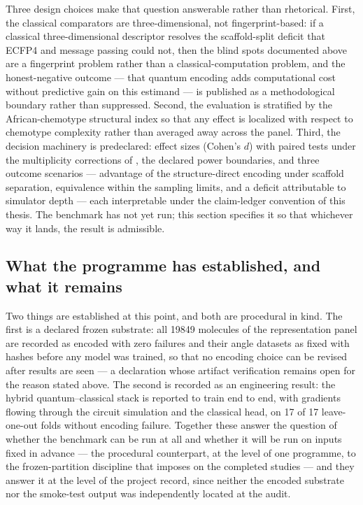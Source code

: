 Three design choices make that question answerable rather than rhetorical. First, the classical comparators are three-dimensional, not fingerprint-based: if a classical three-dimensional descriptor resolves the scaffold-split deficit that ECFP4 and message passing could not, then the blind spots documented above are a fingerprint problem rather than a classical-computation problem, and the honest-negative outcome --- that quantum encoding adds computational cost without predictive gain on this estimand --- is published as a methodological boundary rather than suppressed. Second, the evaluation is stratified by the African-chemotype structural index so that any effect is localized with respect to chemotype complexity rather than averaged away across the panel. Third, the decision machinery is predeclared: effect sizes (Cohen's $d$) with paired tests under the multiplicity corrections of , the declared power boundaries, and three outcome scenarios --- advantage of the structure-direct encoding under scaffold separation, equivalence within the sampling limits, and a deficit attributable to simulator depth --- each interpretable under the claim-ledger convention of this thesis. The benchmark has not yet run; this section specifies it so that whichever way it lands, the result is admissible.

\subsection{What the programme has established, and what it remains}\label{sec:res_qmse_status_discussion}

Two things are established at this point, and both are procedural in kind. The first is a declared frozen substrate: all \num{19849} molecules of the representation panel are recorded as encoded with zero failures and their angle datasets as fixed with hashes before any model was trained, so that no encoding choice can be revised after results are seen --- a declaration whose artifact verification remains open for the reason stated above. The second is recorded as an engineering result: the hybrid quantum--classical stack is reported to train end to end, with gradients flowing through the circuit simulation and the classical head, on \num{17} of \num{17} leave-one-out folds without encoding failure. Together these answer the question of whether the benchmark can be run at all and whether it will be run on inputs fixed in advance --- the procedural counterpart, at the level of one programme, to the frozen-partition discipline that  imposes on the completed studies --- and they answer it at the level of the project record, since neither the encoded substrate nor the smoke-test output was independently located at the audit.

